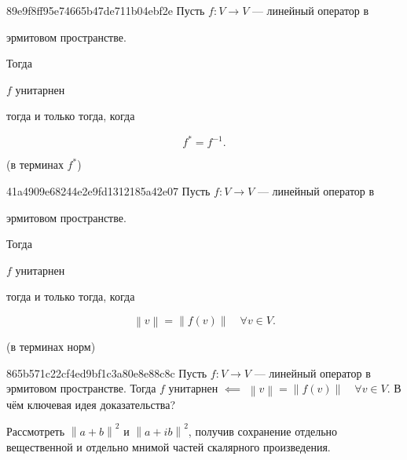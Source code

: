 \begin{note}{89e9f8ff95e74665b47de711b04ebf2e}
    Пусть \({ f : V \to V }\) --- линейный оператор в \begin{icloze}{3}эрмитовом пространстве.\end{icloze}
    Тогда \begin{icloze}{2}\({ f }\) унитарнен\end{icloze} тогда и только тогда, когда
    \begin{icloze}{1}
        \[
            f^* = f^{-1}.
        \]
    \end{icloze}

    \begin{center}
        \tiny
        (в терминах \({ f^* }\))
    \end{center}
\end{note}

\begin{note}{41a4909e68244e2e9fd1312185a42e07}
    Пусть \({ f : V \to V }\) --- линейный оператор в \begin{icloze}{3}эрмитовом пространстве.\end{icloze}
    Тогда \begin{icloze}{2}\({ f }\) унитарнен\end{icloze} тогда и только тогда, когда
    \begin{icloze}{1}
        \[
            \left\lVert v \right\rVert = \left\lVert f(v) \right\rVert \quad \forall v \in V.
        \]
    \end{icloze}

    \begin{center}
        \tiny
        (в терминах норм)
    \end{center}
\end{note}

\begin{note}{865b571c22cf4ed9bf1c3a80e8e88c8c}
    Пусть \({ f : V \to V }\) --- линейный оператор в эрмитовом пространстве.
    Тогда \({ f }\) унитарнен \({ \impliedby }\) \({ \left\lVert v \right\rVert = \left\lVert f(v) \right\rVert \quad \forall v \in V }\).
    В чём ключевая идея доказательства?

    \begin{cloze}{1}
        Рассмотреть \({ \left\lVert a + b \right\rVert^2 }\) и \({ \left\lVert a + ib \right\rVert^2 }\), получив сохранение отдельно вещественной и отдельно мнимой частей скалярного произведения.
    \end{cloze}
\end{note}

